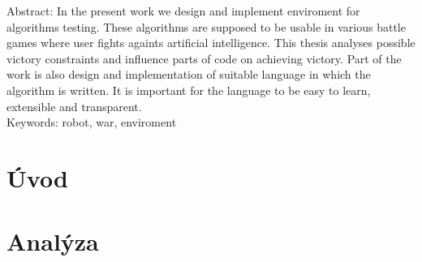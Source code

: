 \documentclass[12pt,notitlepage]{report}
\begin{document}
\noindent Abstract: In the present work we design and implement enviroment for algorithms testing. These algorithms are supposed to be usable in various battle games where user fights againts artificial intelligence. This thesis analyses possible victory constraints and influence parts of code on achieving victory. Part of the work is also design and implementation of suitable language in which the algorithm is written. It is important for the language to be easy to learn, extensible and transparent.
\\
\newline
\noindent Keywords: robot, war, enviroment

\newpage

\chapter{Úvod}%

\chapter{Analýza}
%


\end{document}

